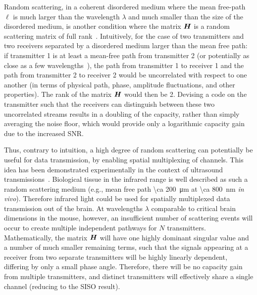 Random scattering, in a coherent disordered medium where the mean free-path $\ell$ is much larger than the wavelength $\lambda$ and much smaller than the size of the disordered medium, is another condition where the matrix $\mat{H}$ is a random scattering matrix of full rank~\cite{moustakas00,popoff10}.
Intuitively, for the case of two transmitters and two receivers separated by a disordered medium larger than the mean free path:
if transmitter 1 is at least a mean-free path from transmitter 2 (or potentially as close as a few wavelengths~\cite{berkovits91}), the path from transmitter 1 to receiver 1 and the path from transmitter 2 to receiver 2 would be uncorrelated with respect to one another (in terms of physical path, phase, amplitude fluctuations, and other properties).
The rank of the matrix $\mat{H}$ would then be 2.
Devising a code on the transmitter such that the receivers can distinguish between these two uncorrelated streams results in a doubling of the capacity, rather than simply averaging the noise floor, which would provide only a logarithmic capacity gain due to the increased SNR.

Thus, contrary to intuition, a high degree of random scattering can potentially be useful for data transmission, by enabling spatial multiplexing of channels.
This idea has been demonstrated experimentally in the context of ultrasound transmissions~\cite{derode03}.
Biological tissue in the infrared range is well described as such a random scattering medium (e.g., mean free path \SI{\ca 200}{\micro\meter} at \SI{\ca 800}{\nano\meter} \emph{in vivo}).
Therefore infrared light could be used for spatially multiplexed data transmission out of the brain.
At wavelengths $\lambda$ comparable to critical brain dimensions in the mouse, however, an insufficient number of scattering events will occur to create multiple independent pathways for $N$ transmitters.
Mathematically, the matrix $\mat{H}$ will have one highly dominant singular value and a number of much smaller remaining terms, such that the signals appearing at a receiver from two separate transmitters will be highly linearly dependent, differing by only a small phase angle.
Therefore, there will be no capacity gain from multiple transmitters, and distinct transmitters will effectively share a single channel (reducing to the SISO result).

